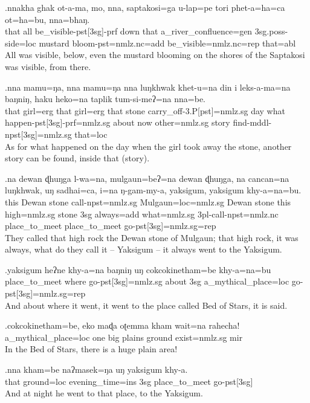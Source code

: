 \exg.nnakha ghak ot-a-ma,   mo, nna,  saptakosi=ga   u-lap=pe  tori phet-a=ha=ca    ot=ha=bu,    nna=bhaŋ.\\
that all  be\_visible{\sc -pst[3sg]-prf} down that a\_river\_confluence{\sc =gen} {\sc 3sg.poss-}side{\sc =loc} mustard bloom{\sc -pst=nmlz.nc=add} be\_visible{\sc =nmlz.nc=rep} that{\sc =abl}\\
All was visible, below, even the mustard blooming on the shores of the Saptakosi was visible, from there.

\exg.nna  mamu=ŋa, nna  mamu=ŋa nna  luŋkhwak khet-u=na   din i  leks-a-ma=na    baŋniŋ, haku heko=na taplik tum-si-meʔ=na nna=be.\\
that girl{\sc =erg} that girl{\sc =erg} that stone carry\_off{\sc -3.P[pst]=nmlz.sg} day what happen{\sc -pst[3sg]-prf=nmlz.sg} about now  other{\sc =nmlz.sg} story  find{\sc -mddl-npst[3sg]=nmlz.sg} that{\sc =loc}\\
As for what happened on the day when the girl took away the stone, another story can be found, inside that (story).

\exg.na dewan  ɖhuŋga l-wa=na,   mulgaun=beʔ=na dewan  ɖhuŋga, na cancan=na  luŋkhwak, uŋ sadhai=ca, i=na   ŋ-gam-my-a,    yaksigum,  yaksigum  khy-a=na=bu.\\
this Dewan stone  call{\sc -npst=nmlz.sg} Mulgaun{\sc =loc=nmlz.sg} Dewan stone  this high{\sc =nmlz.sg} stone {\sc 3sg} always{\sc =add} what{\sc =nmlz.sg} {\sc 3pl-}call{\sc -npst=nmlz.nc} place\_to\_meet place\_to\_meet go{\sc -pst[3sg]=nmlz.sg=rep}\\
They called that high rock the Dewan stone of Mulgaun; that high rock, it was always, what do they call it -- Yaksigum -- it always went to the Yaksigum.

\exg.yaksigum  heʔne khy-a=na   baŋniŋ uŋ cokcokinetham=be khy-a=na=bu\\
place\_to\_meet where  go{\sc -pst[3sg]=nmlz.sg} about  {\sc 3sg} a\_mythical\_place{\sc =loc} go{\sc -pst[3sg]=nmlz.sg=rep}\\
And about where it went, it went to the place called Bed of Stars, it is said.

\exg.cokcokinetham=be, eko maɖa oʈemma kham wait=na  rahecha!\\
a\_mythical\_place{\sc =loc} one big plains  ground exist{\sc [3sg]=nmlz.sg} {\sc mir}\\
In the Bed of Stars, there is a huge plain area!

\exg.nna  kham=be  naʔmasek=ŋa  uŋ yaksigum  khy-a.\\
that ground=loc evening\_time{\sc =ins} {\sc 3sg} place\_to\_meet go{\sc -pst[3sg]}\\
And at night he went to that place, to the Yaksigum.

